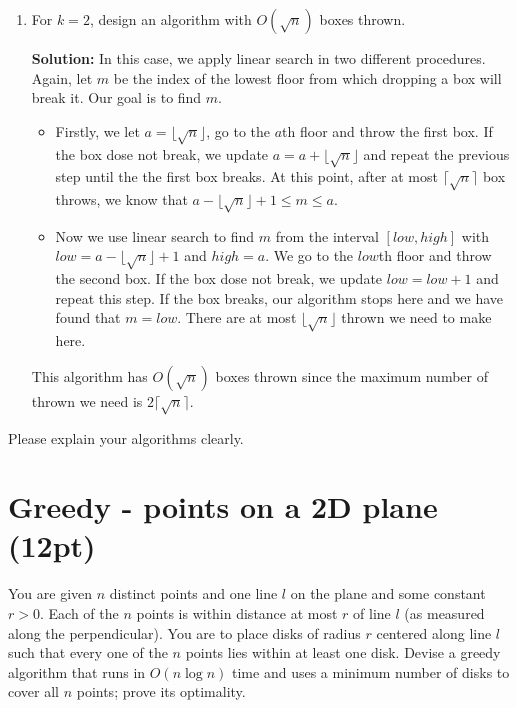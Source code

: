 \documentclass{article}
\begin{document}
\begin{enumerate}
\item For $k=2$, design an algorithm with ${O}(\sqrt{n})$
  boxes thrown.
\begin{tcolorbox}
\textbf{Solution:} In this case, we apply linear search in two different procedures. Again, let $m$ be the index of the lowest floor from which dropping a box will break it.  Our goal is to find $m$. 
\begin{itemize}
\item Firstly, we let $a = \lfloor \sqrt{n} \rfloor$, go to the $a$th floor and throw the first box. If the box dose not break, we update $a = a + \lfloor \sqrt{n} \rfloor$ and repeat the previous step until the the first box breaks. At this point, after at most $\lceil \sqrt{n} \rceil$ box throws, we know that $a - \lfloor \sqrt{n} \rfloor + 1 \leq m \leq a$. 
\item Now we use linear search to find $m$ from the interval $[low, high]$ with $low = a - \lfloor \sqrt{n} \rfloor + 1$ and $high = a$. We go to the $low$th floor and throw the second box. If the box dose not break, we update $low = low + 1$ and repeat this step. If the box breaks, our algorithm stops here and we have found that $m = low$. There are at most $\lfloor \sqrt{n} \rfloor$ thrown we need to make here.
\end{itemize}
This algorithm has ${O}(\sqrt{n})$ boxes thrown since the maximum number of thrown we need is $2\lceil \sqrt{n} \rceil$.
\end{tcolorbox}

\end{enumerate}

Please explain your algorithms clearly.

\section{Greedy - points on a 2D plane (12pt)}
You are given $n$ distinct points and one line $l$ on the plane and some constant $r > 0$. Each of the $n$ points is within distance at most $r$ of line $l$ (as measured along the perpendicular). You are to place disks of radius $r$ centered along line $l$ such that every one of the $n$ points lies within at least one disk. Devise a greedy algorithm that runs in $O(n\log n)$ time and uses a minimum number of disks to cover all $n$ points; prove its optimality.
\end{document}
